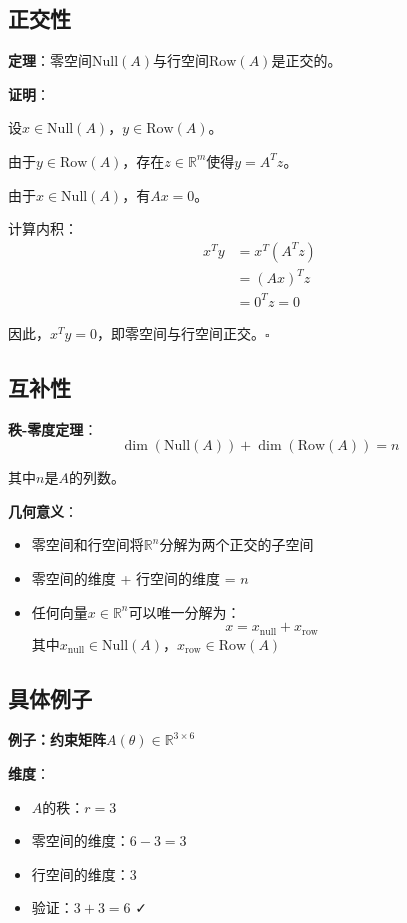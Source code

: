 \documentclass[12pt,a4paper]{article}
\begin{document}
\subsection{正交性}

\textbf{定理}：零空间$\text{Null}(A)$与行空间$\text{Row}(A)$是正交的。

\textbf{证明}：

设$x \in \text{Null}(A)$，$y \in \text{Row}(A)$。

由于$y \in \text{Row}(A)$，存在$z \in \mathbb{R}^m$使得$y = A^T z$。

由于$x \in \text{Null}(A)$，有$Ax = 0$。

计算内积：
\begin{align}
x^T y &= x^T (A^T z) \\
&= (Ax)^T z \\
&= 0^T z = 0
\end{align}

因此，$x^T y = 0$，即零空间与行空间正交。$\square$

\subsection{互补性}

\textbf{秩-零度定理}：
\begin{equation}
\dim(\text{Null}(A)) + \dim(\text{Row}(A)) = n
\end{equation}

其中$n$是$A$的列数。

\textbf{几何意义}：
\begin{itemize}
\item 零空间和行空间将$\mathbb{R}^n$分解为两个正交的子空间
\item 零空间的维度 + 行空间的维度 = $n$
\item 任何向量$x \in \mathbb{R}^n$可以唯一分解为：
\begin{equation}
x = x_{\text{null}} + x_{\text{row}}
\end{equation}
其中$x_{\text{null}} \in \text{Null}(A)$，$x_{\text{row}} \in \text{Row}(A)$
\end{itemize}

\subsection{具体例子}

\textbf{例子：约束矩阵$A(\theta) \in \mathbb{R}^{3 \times 6}$}

\textbf{维度}：
\begin{itemize}
\item $A$的秩：$r = 3$
\item 零空间的维度：$6 - 3 = 3$
\item 行空间的维度：$3$
\item 验证：$3 + 3 = 6$ ✓
\end{itemize}
\end{document}
